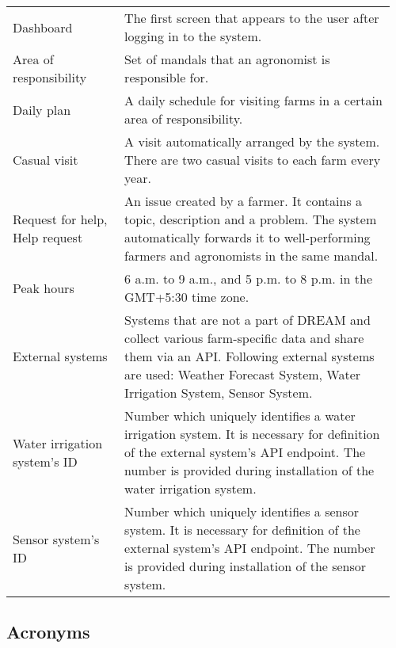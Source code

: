 \begin{center}
\begin{longtable}{@{}p{0.28\linewidth} p{0.68\linewidth}@{}}
        Dashboard               & The first screen that appears to the user after logging in to the system.\\
        Area of responsibility  & Set of mandals that an agronomist is responsible for.\\
        Daily plan              & A daily schedule for visiting farms in a certain area of responsibility.\\
        Casual visit            & A visit automatically arranged by the system. There are two casual visits to each farm every year.\\
        Request for help, Help request & An issue created by a farmer. It contains a topic, description and a problem. The system automatically forwards it to well-performing farmers and agronomists in the same mandal.\\
        Peak hours              & 6 a.m. to 9 a.m., and 5 p.m. to 8 p.m. in the GMT+5:30 time zone.\\
        External systems        & Systems that are not a part of DREAM and collect various farm-specific data and share them via an API. Following external systems are used: Weather Forecast System, Water Irrigation System, Sensor System.\\
        Water irrigation system's ID    & Number which uniquely identifies a water irrigation system. It is necessary for definition of the external system's API endpoint. The number is provided during installation of the water irrigation system.  \\
        Sensor system's ID              & Number which uniquely identifies a sensor system. It is necessary for definition of the external system's API endpoint. The number is provided during installation of the sensor system. \\
	\end{longtable}
\end{center}

\subsection{Acronyms}


